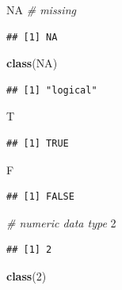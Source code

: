 \documentclass[]{book}
\newenvironment{Shaded}{\begin{snugshade}}{\end{snugshade}}
\newcommand{\KeywordTok}[1]{\textcolor[rgb]{0.13,0.29,0.53}{\textbf{{#1}}}}
\newcommand{\DecValTok}[1]{\textcolor[rgb]{0.00,0.00,0.81}{{#1}}}
\newcommand{\CommentTok}[1]{\textcolor[rgb]{0.56,0.35,0.01}{\textit{{#1}}}}
\newcommand{\OtherTok}[1]{\textcolor[rgb]{0.56,0.35,0.01}{{#1}}}
\newcommand{\NormalTok}[1]{{#1}}
\begin{document}
\begin{Shaded}
\begin{Highlighting}[]
\OtherTok{NA}  \CommentTok{# missing}
\end{Highlighting}
\end{Shaded}

\begin{verbatim}
## [1] NA
\end{verbatim}

\begin{Shaded}
\begin{Highlighting}[]
\KeywordTok{class}\NormalTok{(}\OtherTok{NA}\NormalTok{)}
\end{Highlighting}
\end{Shaded}

\begin{verbatim}
## [1] "logical"
\end{verbatim}

\begin{Shaded}
\begin{Highlighting}[]
\NormalTok{T}
\end{Highlighting}
\end{Shaded}

\begin{verbatim}
## [1] TRUE
\end{verbatim}

\begin{Shaded}
\begin{Highlighting}[]
\NormalTok{F}
\end{Highlighting}
\end{Shaded}

\begin{verbatim}
## [1] FALSE
\end{verbatim}

\begin{Shaded}
\begin{Highlighting}[]
\CommentTok{# numeric data type}
\DecValTok{2}
\end{Highlighting}
\end{Shaded}

\begin{verbatim}
## [1] 2
\end{verbatim}

\begin{Shaded}
\begin{Highlighting}[]
\KeywordTok{class}\NormalTok{(}\DecValTok{2}\NormalTok{)}
\end{Highlighting}
\end{Shaded}
\end{document}
